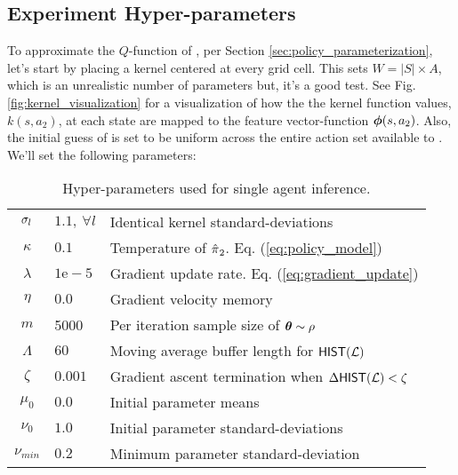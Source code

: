     \begin{figure}[htb]
        \begin{center}

        \end{center}
    \end{figure}

    \subsection{Experiment Hyper-parameters}
    To approximate the $Q$-function of , per Section \ref{sec:policy_parameterization}, let's start by placing
    a kernel centered at every grid cell. This sets $W=|S|\times A$, which is an unrealistic number of parameters but,
    it's a good test. See Fig.  \ref{fig:kernel_visualization} for a visualization of how the the kernel function
    values, $k(s,a_2)$, at each state are mapped to the feature vector-function $\boldsymbol{\mathbb{\phi}}(s, a_2)$. Also, the initial guess of
     is set to be uniform across the entire action set available to . We'll set the following
    parameters:

    \begin{table}[H]
        \centering
        \begin{tabular}{c|l l}
                $\sigma_{l}$ & $1.1,\ \forall l$ & Identical kernel standard-deviations\\
                $\kappa$ & $0.1$ & Temperature of $\hat{\pi_{}}_2$. Eq. (\ref{eq:policy_model}) \\
                $\lambda$ & $1\mathrm{e}\!-\!5$ & Gradient update rate. Eq. (\ref{eq:gradient_update}) \\
                $\eta$ & $0.0$ & Gradient velocity memory\\
                $m$ & 5000 & Per iteration sample size of $\boldsymbol{\mathbb{\theta}}\sim \rho$\\
                $\Lambda$ & $60$ & Moving average buffer length for $\mathsf{HIST}(\mathcal{L})$ \\
                $\zeta$ & $0.001$ & Gradient ascent termination when $\Delta\mathsf{HIST}(\mathcal{L}) < \zeta$\\
                    $\mu_{0}$ & $0.0$ & Initial parameter means\\
                $\nu_{0}$ & $1.0$ & Initial parameter standard-deviations\\
                $\nu_{min}$ & $0.2$ & Minimum parameter standard-deviation\\
        \end{tabular}
        \caption{Hyper-parameters used for single agent inference.}
        \label{table:single_agent_hyper_params}
    \end{table}

